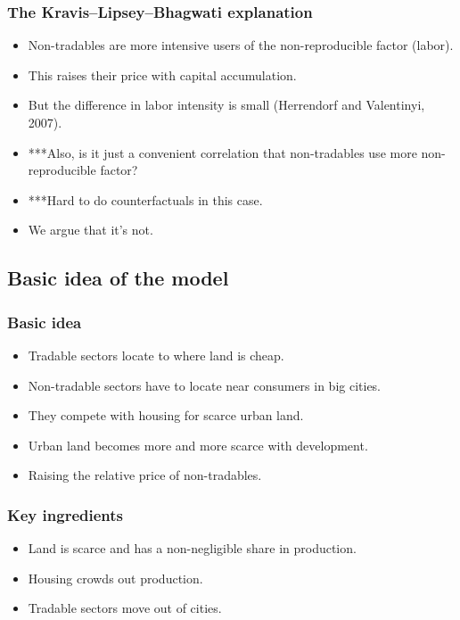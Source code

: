 \documentclass[compress,mathserif]{beamer}
\begin{document}
\begin{frame}\frametitle{The Kravis--Lipsey--Bhagwati explanation}
\begin{itemize}
    \item Non-tradables are more intensive users of the non-reproducible factor (labor).
    \item This raises their price with capital accumulation.
    \item But the difference in labor intensity is small (Herrendorf and Valentinyi, 2007).
    \item ***Also, is it just a convenient correlation that non-tradables use more non-reproducible factor?
    \item ***Hard to do counterfactuals in this case.
    \item We argue that it's not.
\end{itemize}
\end{frame}



\subsection{Basic idea of the model}
\begin{frame}\frametitle{Basic idea}
\begin{itemize}
    \item Tradable sectors locate to where land is cheap.
    \item Non-tradable sectors have to locate near consumers in big cities.
    \item They compete with housing for scarce urban land.
    \item Urban land becomes more and more scarce with development.
    \item Raising the relative price of non-tradables.
\end{itemize}
\end{frame}

\begin{frame}\frametitle{Key ingredients}
\begin{itemize}
    \item Land is scarce and has a non-negligible share in production.
    \item Housing crowds out production.
    \item Tradable sectors move out of cities.
\end{itemize}
\end{frame}
\end{document}

